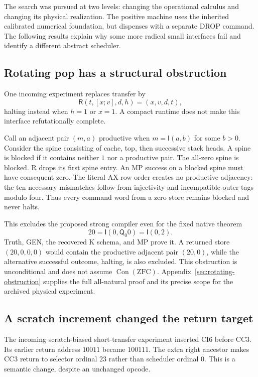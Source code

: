 \documentclass[11pt]{article}
\newcommand{\imp}{\mathsf I}
\newcommand{\quant}{\mathsf Q}
\newcommand{\Con}{\operatorname{Con}}
\begin{document}
The search was pursued at two levels: changing the operational
calculus and changing its physical realization. The positive
machine uses the inherited calibrated numerical foundation,
but dispenses with a separate DROP command. The following
results explain why some more radical small interfaces fail
and identify a different abstract scheduler.

\subsection{Rotating pop has a structural obstruction}

One incoming experiment replaces transfer by
\[
 \mathsf R(t,[x;v],d,h)=(x,v,d,t),
\]
halting instead when $h=1$ or $x=1$. A compact runtime does
not make this interface refutationally complete.

Call an adjacent pair $(m,a)$ productive when
$m=\imp(a,b)$ for some $b>0$. Consider the spine consisting
of cache, top, then successive stack heads. A spine is
blocked if it contains neither $1$ nor a productive pair.
The all-zero spine is blocked. R drops its first spine
entry. An MP success on a blocked spine must have
consequent zero. The literal AX row order creates no
productive adjacency: the ten necessary mismatches
follow from injectivity and incompatible outer tags
modulo four. Thus every command word from a zero store
remains blocked and never halts.

This excludes the proposed strong compiler even for the
fixed native theorem
\[
                    20=\imp(0,\quant_0 0)=\imp(0,2).
\]
Truth, GEN, the recovered K schema, and MP prove it.
A returned store $(20,0,0,0)$ would contain the productive
adjacent pair $(20,0)$, while the alternative successful
outcome, halting, is also excluded. This obstruction is
unconditional and does not assume $\Con(\mathrm{ZFC})$.
Appendix~\ref{sec:rotating-obstruction} supplies the full
all-natural proof and its precise scope for the archived
physical experiment.

\subsection{A scratch increment changed the return target}

The incoming scratch-biased short-transfer experiment inserted
CI6 before CC3. Its earlier return address $10011$ became
$100111$. The extra right ancestor makes CC3 return to
selector ordinal 23 rather than scheduler ordinal 0.
This is a semantic change, despite an unchanged opcode.
\end{document}
